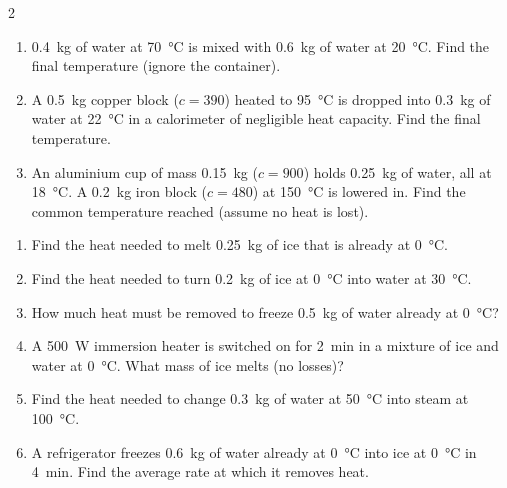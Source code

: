 \documentclass[10pt]{article}
\begin{document}
\begin{multicols}{2}
\begin{tcolorbox}[breakable,enhanced,colback=exbg,colframe=exgreen,
  coltitle=white,fonttitle=\bfseries,
  title=Part C --- Method of mixtures,
  boxrule=0.6pt,arc=2pt]
\begin{enumerate}[leftmargin=*,nosep,label=\textbf{Q\arabic*.},start=13]
  \item \SI{0.4}{\kilogram} of water at \SI{70}{\degreeCelsius} is mixed
        with \SI{0.6}{\kilogram} of water at \SI{20}{\degreeCelsius}.
        Find the final temperature (ignore the container).
  \item A \SI{0.5}{\kilogram} copper block ($c=390$) heated to
        \SI{95}{\degreeCelsius} is dropped into \SI{0.3}{\kilogram} of
        water at \SI{22}{\degreeCelsius} in a calorimeter of negligible
        heat capacity. Find the final temperature.
  \item An aluminium cup of mass \SI{0.15}{\kilogram} ($c=900$) holds
        \SI{0.25}{\kilogram} of water, all at \SI{18}{\degreeCelsius}.
        A \SI{0.2}{\kilogram} iron block ($c=480$) at
        \SI{150}{\degreeCelsius} is lowered in. Find the common
        temperature reached (assume no heat is lost).
\end{enumerate}
\end{tcolorbox}

\begin{tcolorbox}[breakable,enhanced,colback=exbg,colframe=exgreen,
  coltitle=white,fonttitle=\bfseries,
  title=Part D --- Latent heat,
  boxrule=0.6pt,arc=2pt]
\begin{enumerate}[leftmargin=*,nosep,label=\textbf{Q\arabic*.},start=16]
  \item Find the heat needed to melt \SI{0.25}{\kilogram} of ice that is
        already at \SI{0}{\degreeCelsius}.
  \item Find the heat needed to turn \SI{0.2}{\kilogram} of ice at
        \SI{0}{\degreeCelsius} into water at \SI{30}{\degreeCelsius}.
  \item How much heat must be removed to freeze \SI{0.5}{\kilogram} of
        water already at \SI{0}{\degreeCelsius}?
  \item A \SI{500}{\watt} immersion heater is switched on for
        \SI{2}{\minute} in a mixture of ice and water at
        \SI{0}{\degreeCelsius}. What mass of ice melts (no losses)?
  \item Find the heat needed to change \SI{0.3}{\kilogram} of water at
        \SI{50}{\degreeCelsius} into steam at \SI{100}{\degreeCelsius}.
  \item A refrigerator freezes \SI{0.6}{\kilogram} of water already at
        \SI{0}{\degreeCelsius} into ice at \SI{0}{\degreeCelsius} in
        \SI{4}{\minute}. Find the average rate at which it removes heat.
\end{enumerate}
\end{tcolorbox}


\end{multicols}
\end{document}

